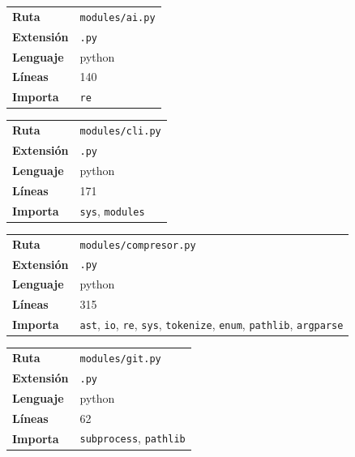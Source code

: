 \documentclass[12pt, a4paper]{report}
\begin{document}
\medskip

\begin{fichabox}
\small
\begin{tabular}{@{}ll@{}}
  \textbf{Ruta} & \texttt{modules/ai.py} \\
  \textbf{Extensión} & \texttt{.py} \\
  \textbf{Lenguaje} & python \\
  \textbf{Líneas} & 140 \\
  \textbf{Importa} & \parbox[t]{10cm}{\texttt{re}} \\
\end{tabular}
\end{fichabox}

\medskip

\begin{fichabox}
\small
\begin{tabular}{@{}ll@{}}
  \textbf{Ruta} & \texttt{modules/cli.py} \\
  \textbf{Extensión} & \texttt{.py} \\
  \textbf{Lenguaje} & python \\
  \textbf{Líneas} & 171 \\
  \textbf{Importa} & \parbox[t]{10cm}{\texttt{sys}, \texttt{modules}} \\
\end{tabular}
\end{fichabox}

\medskip

\begin{fichabox}
\small
\begin{tabular}{@{}ll@{}}
  \textbf{Ruta} & \texttt{modules/compresor.py} \\
  \textbf{Extensión} & \texttt{.py} \\
  \textbf{Lenguaje} & python \\
  \textbf{Líneas} & 315 \\
  \textbf{Importa} & \parbox[t]{10cm}{\texttt{ast}, \texttt{io}, \texttt{re}, \texttt{sys}, \texttt{tokenize}, \texttt{enum}, \texttt{pathlib}, \texttt{argparse}} \\
\end{tabular}
\end{fichabox}

\medskip

\begin{fichabox}
\small
\begin{tabular}{@{}ll@{}}
  \textbf{Ruta} & \texttt{modules/git.py} \\
  \textbf{Extensión} & \texttt{.py} \\
  \textbf{Lenguaje} & python \\
  \textbf{Líneas} & 62 \\
  \textbf{Importa} & \parbox[t]{10cm}{\texttt{subprocess}, \texttt{pathlib}} \\
\end{tabular}
\end{fichabox}
\end{document}

